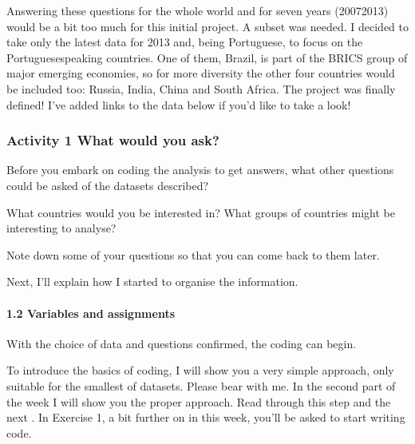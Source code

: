 \documentclass[letterpaper,10pt,english]{sphinxmanual}
\let\sphinxpxdimen\pdfpxdimen\else\newdimen\sphinxpxdimen
\begin{document}
Answering these questions for the whole world and for seven years (2007\textendash{}2013) would be a bit too much for this initial project. A subset was needed. I decided to take only the latest data for 2013 and, being Portuguese, to focus on the Portuguese\sphinxhyphen{}speaking countries. One of them, Brazil, is part of the BRICS group of major emerging economies, so for more diversity the other four countries would be included too: Russia, India, China and South Africa. The project was finally defined! I’ve added
links to the data below if you’d like to take a look!


\subsubsection{Activity 1 What would you ask?}
\label{\detokenize{content/session_01/Part_01_02:Activity-1-What-would-you-ask?}}
Before you embark on coding the analysis to get answers, what other questions could be asked of the datasets described?

What countries would you be interested in? What groups of countries might be interesting to analyse?

Note down some of your questions so that you can come back to them later.



Next, I’ll explain how I started to organise the information.


\paragraph{1.2 Variables and assignments}
\label{\detokenize{content/session_01/Part_01_02:1.2-Variables-and-assignments}}
With the choice of data and questions confirmed, the coding can begin.

\sphinxincludegraphics[width=512\sphinxpxdimen,height=341\sphinxpxdimen]{{ou_futurelearn_learn_to_code_fig_1027}.jpg}


To introduce the basics of coding, I will show you a very simple approach, only suitable for the smallest of datasets. Please bear with me. In the second part of the week I will show you the proper approach. Read through this step and the next \textendash{} . In Exercise 1, a bit further on in this week, you’ll be asked to start writing code.
\end{document}
